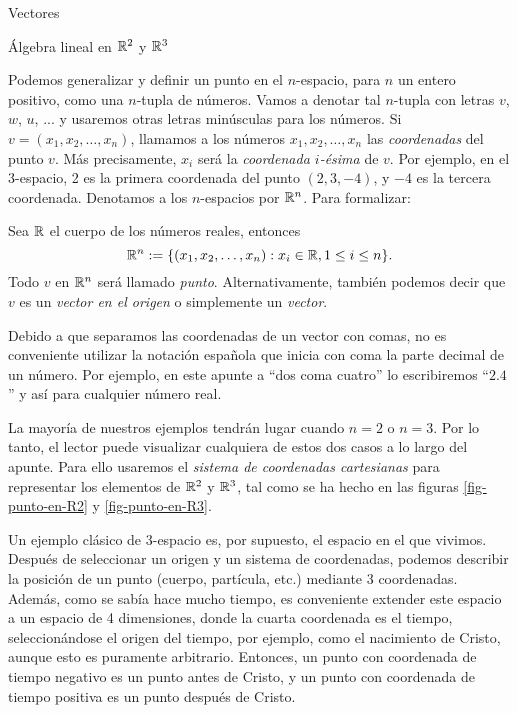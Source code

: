 \begin{chapter}{Vectores}
\begin{section}{\'Algebra lineal en $\mathbb R^2$ y $\mathbb R^3$}
    
        Podemos generalizar y definir un punto en el $n$-espacio, para $n$ un entero positivo, como una $n$-tupla de números. Vamos a denotar tal $n$-tupla con letras $v$, $w$, $u$, ... y usaremos otras letras minúsculas para los números. Si $v =(x_1,x_2,\ldots,x_n)$, llamamos a los números $x_1,x_2,\ldots,x_n$ las \textit{coordenadas} del punto $v$. Más precisamente, $x_i$ será la \textit{coordenada $i$-ésima} de $v$. Por ejemplo, en el 3-espacio, 2 es la primera coordenada del punto $(2,3, -4)$, y $-4$ es la tercera coordenada. Denotamos a los  $n$-espacios por $\mathbb R^n$. Para formalizar:
        \begin{definicion}
            Sea $\mathbb R$ el cuerpo de los números reales,  entonces
            \begin{equation*}
                \mathbb R^n:= \{(x_1,x_2,\ldots,x_n): x_i \in \mathbb R, 1 \le i \le n \}.
            \end{equation*}
            Todo $v$ en $\mathbb R^n$ será llamado {\em punto}. Alternativamente, también podemos decir que $v$  es un \textit{vector en el origen} o simplemente un \textit{vector}. 

        \end{definicion}
        
        \begin{obs*} Debido  a que separamos las coordenadas de un vector con comas, no es conveniente utilizar la notación española que inicia con coma la parte decimal de un número. Por ejemplo,  en este apunte  a ``dos coma cuatro'' lo escribiremos ``$2.4$'' y así para cualquier número real.  
        \end{obs*}

        La mayoría de nuestros ejemplos tendrán lugar cuando $n = 2$ o $n = 3$. Por lo tanto, el lector puede visualizar cualquiera de estos dos casos a lo largo del apunte. Para ello usaremos el {\em sistema  de coordenadas cartesianas} para representar los elementos de  $\mathbb R^2$ y  $\mathbb R^3$, tal como se ha hecho en las figuras \ref{fig-punto-en-R2} y \ref{fig-punto-en-R3}.
        
    
    
        \begin{ejemplo*} \label{ej-3espacio-industria}
            Un ejemplo clásico de 3-espacio es, por supuesto, el espacio en el que vivimos. Después de seleccionar un origen y un sistema de coordenadas, podemos describir la posición de un punto (cuerpo, partícula, etc.) mediante 3 coordenadas. Además, como se sabía hace mucho tiempo, es conveniente extender este espacio a un espacio de 4 dimensiones, donde la cuarta coordenada es el tiempo, seleccionándose el origen del tiempo, por ejemplo, como el nacimiento de Cristo, aunque esto es puramente arbitrario. Entonces, un punto con coordenada de tiempo negativo es un punto antes de Cristo, y un punto con coordenada  de tiempo positiva es un punto después de Cristo.
            

\end{ejemplo*}
\end{section}
\end{chapter}
